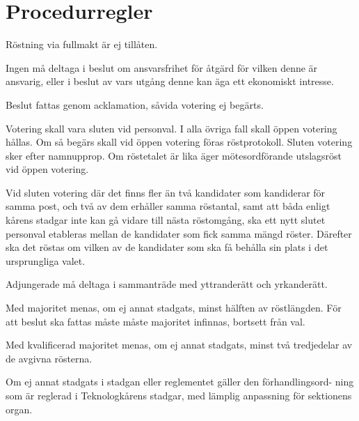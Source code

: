 \documentclass[stadgar]{dsekprotokoll}
\begin{document}
\section{Procedurregler}

\begin{stadgeavsnitt}


Röstning via fullmakt är ej tillåten.


Ingen må deltaga i beslut om ansvarsfrihet för åtgärd för vilken denne är ansvarig, 
eller i beslut av vars utgång denne kan äga
ett ekonomiskt intresse.


Beslut fattas genom acklamation, såvida votering ej begärts.


Votering skall vara sluten vid personval. I alla övriga fall skall öppen
votering hållas. Om så begärs skall vid öppen votering föras röstprotokoll.
Sluten votering sker efter namnupprop. Om röstetalet är lika äger
mötesordförande utslagsröst vid öppen votering.

Vid sluten votering där det finns fler än två kandidater som kandiderar för samma post, 
och två av dem erhåller samma röstantal, samt att båda enligt kårens stadgar inte kan gå 
vidare till nästa röstomgång, ska ett nytt slutet personval etableras mellan de kandidater
som fick samma mängd röster. Därefter ska det röstas om vilken av de kandidater som ska få 
behålla sin plats i det ursprungliga valet.


Adjungerade må deltaga i sammanträde med yttranderätt och yrkanderätt.


Med majoritet menas, om ej annat stadgats, minst hälften av röstlängden. För att beslut ska fattas måste måste majoritet infinnas, bortsett från val.


Med kvalificerad majoritet menas, om ej annat stadgats, minst två
tredjedelar av de avgivna rösterna.


Om ej annat stadgats i stadgan eller reglementet gäller den förhandlingsord- ning som är reglerad i Teknologkårens stadgar, med lämplig anpassning för sektionens organ.

\end{stadgeavsnitt}
\end{document}
